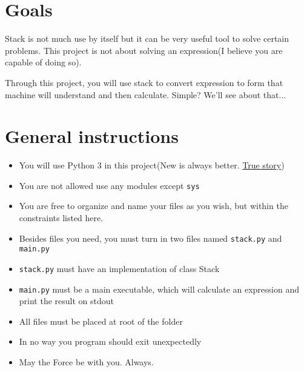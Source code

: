 \documentclass{42-en}
\begin{document}


\chapter{Goals}

    Stack is not much use by itself but it can be very useful tool to solve certain
    problems. This project is not about solving an expression(I believe you are
    capable of doing so).

    Through this project, you will use stack to convert expression to form that
    machine will understand and then calculate. Simple? We'll see about that...


\chapter{General instructions}

    \begin{itemize}\itemsep1pt
        \item You will use Python 3 in this project(New is always better. \href{https://en.wikipedia.org/wiki/Barney_Stinson}{True story})
        \item You are not allowed use any modules except \texttt{sys}
        \item You are free to organize and name your files as you wish,
        but within the constraints listed here.
        \item Besides files you need, you must turn in two files named
        \texttt{stack.py} and \texttt{main.py}
        \item \texttt{stack.py} must have an implementation of class Stack
        \item \texttt{main.py} must be a main executable, which will calculate an expression
        and print the result on stdout
        \item All files must be placed at root of the folder
        \item In no way you program should exit unexpectedly
        \item May the Force be with you. Always.
    \end{itemize}
\end{document}
